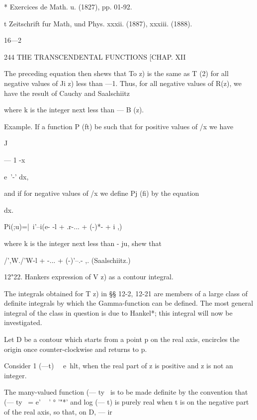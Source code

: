 * Exercices de Math. u. (1827), pp. 01-92. 

t Zeitschrift fur Math, und Phys. xxxii. (1887), xxxiii. (1888). 

16—2 



244 THE TRANSCENDENTAL FUNCTIONS [CHAP. XII 

The preceding equation then shews that To  z) is the same as T (2) for all negative 
values of Ji z) less than —1. Thus, for all negative values of R(z), we have the result of 
Cauchy and Saalschiitz 

where k is the integer next less than — B (z). 

Example. If a function P (ft) be such that for positive values of /x we have 



J 



— 1  -x 



e~'-' dx, 



and if for negative values of /x we define Pj (fi) by the equation 

dx. 



Pi(;u)=|\ i'--i(e- -l + .r-... + (-)*- + i ,) 



where k is the integer next less than - ju, shew that 

/',W./'W-l +  -... + (-)'--.- ,. (Saalschiitz.) 

12"22. Hankers expression of V  z) as a contour integral. 

The integrals obtained for T  z) in §§ 12-2, 12-21 are members of a large 
class of definite integrals by which the Gamma-function can be defined. 
The most general integral of the class in question is due to Hankel*; this 
integral will now be investigated. 

Let D be a contour which starts from a point p on the real axis, encircles 
the origin once counter-clockwise and returns to p. 

Consider 1 (—t)~~ e~hlt, when the real part of z is positive and z is not 
an integer. 

The many-valued function (— ty~  is to be made definite by the convention 
that (— ty~  = e' ~ '  °  '"*' and log (— t) is purely real when t is on the negative 
part of the real axis, so that, on D, — ir %

